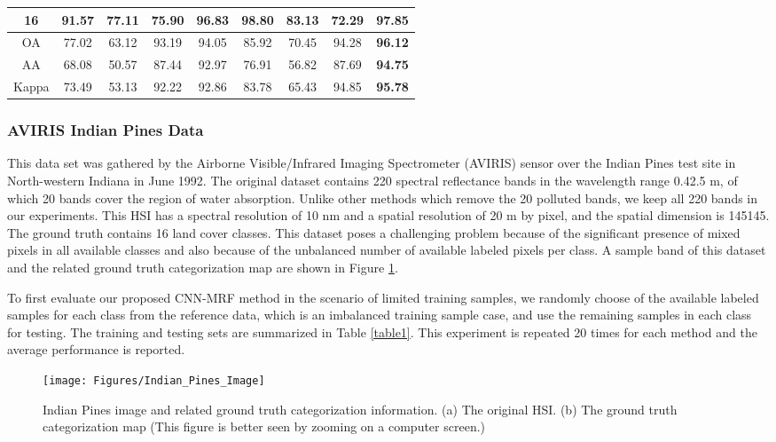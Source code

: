 \documentclass[journal]{IEEEtran}
\begin{document}
\begin{table*}[t!]
\begin{center}
{{\begin{tabular}{|c||c|c|c|c|c|c|c|c|}
16	& 91.57 & 77.11 & 75.90 &  96.83 & \bf{98.80} & 83.13  & 72.29 &  97.85 \\ 
							\hline
							OA  & 77.02 & 63.12 & 93.19 &  94.05 & 85.92 & 70.45  & 94.28 &  \bf{96.12}  \\ 
AA	& 68.08 & 50.57 & 87.44 &  92.97 & 76.91 & 56.82  & 87.69 &  \bf{94.75} \\ 
Kappa	& 73.49 & 53.13 & 92.22 &  92.86 & 83.78 & 65.43  & 94.85 &  \bf{95.78} \\ 
							\hline
\end{tabular}
					}
				}
			\end{center}
		\end{table*}	
		
		\subsubsection{AVIRIS Indian Pines Data}
		This data set was gathered by the Airborne Visible/Infrared Imaging Spectrometer (AVIRIS) sensor over the Indian Pines test site in North-western Indiana in June 1992. The original dataset contains 220 spectral reflectance bands in the wavelength range 0.42.5 {{m}}, of which 20 bands cover the region of water absorption. Unlike other methods which remove the 20 polluted bands, we keep all 220 bands in our experiments. This HSI has a spectral resolution of 10 {{nm}} and a spatial resolution of 20 {{m}} by pixel, and the spatial dimension is 145145. The ground truth contains 16 land cover classes. This dataset poses a challenging problem because of the significant presence of mixed pixels in all available classes and also because of the unbalanced number of available labeled pixels per class. A sample band of this dataset and the related ground truth categorization map are shown in Figure \ref{indianpines_Image}. 
		
		To first evaluate our proposed CNN-MRF method in the scenario of limited training samples, we randomly choose  of the available labeled samples for each class from the reference data, which is an imbalanced training sample case, and use the remaining samples in each class for testing. The training and testing sets are summarized in Table \ref{table1}. This experiment is repeated 20 times for each method and the average performance is reported. 
		
		\begin{figure}
			\centering
			\texttt{[image: Figures/Indian\_Pines\_Image]}
			\caption{{{Indian Pines image and related ground truth categorization information. (a) The original HSI. (b) The ground truth categorization map (This figure is better seen by zooming on a computer screen.)}}}\label{indianpines_Image}
		\end{figure}	
		
\end{document}
